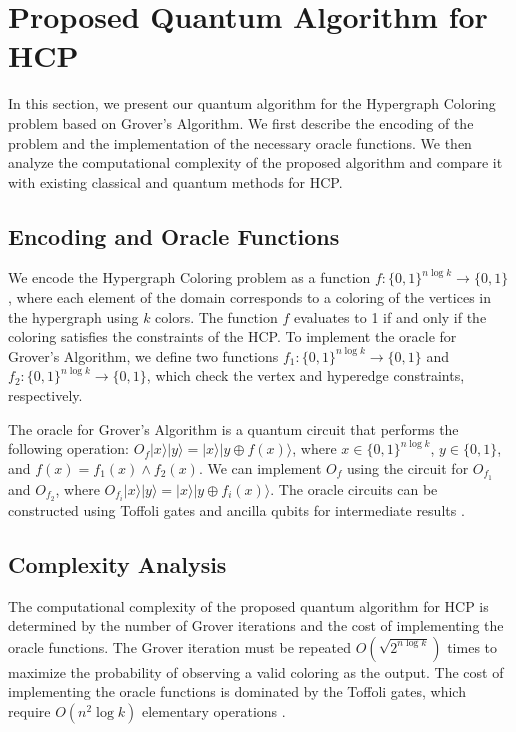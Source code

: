 \section{Proposed Quantum Algorithm for HCP}

In this section, we present our quantum algorithm for the Hypergraph Coloring problem based on Grover's Algorithm. We first describe the encoding of the problem and the implementation of the necessary oracle functions. We then analyze the computational complexity of the proposed algorithm and compare it with existing classical and quantum methods for HCP.

\subsection{Encoding and Oracle Functions}

We encode the Hypergraph Coloring problem as a function $f : \{0, 1\}^{n \log k} \rightarrow \{0, 1\}$, where each element of the domain corresponds to a coloring of the vertices in the hypergraph using $k$ colors. The function $f$ evaluates to 1 if and only if the coloring satisfies the constraints of the HCP. To implement the oracle for Grover's Algorithm, we define two functions $f_1 : \{0, 1\}^{n \log k} \rightarrow \{0, 1\}$ and $f_2 : \{0, 1\}^{n \log k} \rightarrow \{0, 1\}$, which check the vertex and hyperedge constraints, respectively.

The oracle for Grover's Algorithm is a quantum circuit that performs the following operation: $O_f |x\rangle|y\rangle = |x\rangle|y \oplus f(x)\rangle$, where $x \in \{0, 1\}^{n \log k}$, $y \in \{0, 1\}$, and $f(x) = f_1(x) \land f_2(x)$. We can implement $O_f$ using the circuit for $O_{f_1}$ and $O_{f_2}$, where $O_{f_i} |x\rangle|y\rangle = |x\rangle|y \oplus f_i(x)\rangle$. The oracle circuits can be constructed using Toffoli gates and ancilla qubits for intermediate results \cite{nielsen2002quantum}.

\subsection{Complexity Analysis}

The computational complexity of the proposed quantum algorithm for HCP is determined by the number of Grover iterations and the cost of implementing the oracle functions. The Grover iteration must be repeated $O(\sqrt{2^{n \log k}})$ times to maximize the probability of observing a valid coloring as the output. The cost of implementing the oracle functions is dominated by the Toffoli gates, which require $O(n^2 \log k)$ elementary operations \cite{nielsen2002quantum}.

